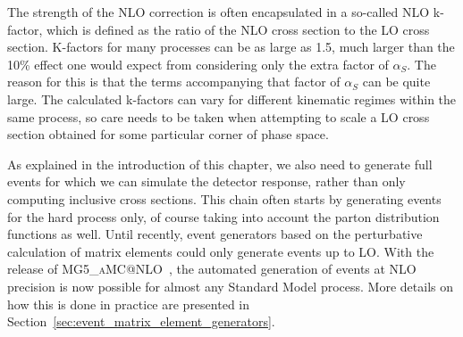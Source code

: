 The strength of the NLO correction is often encapsulated in a so-called NLO k-factor, which is
defined as the ratio of the NLO cross section to the LO cross section. K-factors for many processes
can be as large as 1.5, much larger than the 10\% effect one would expect from considering only the
extra factor of $\alpha_S$. The reason for this is that the terms accompanying that factor of
$\alpha_S$ can be quite large. 
The calculated k-factors can vary for different kinematic regimes within the same process, so care
needs to be taken when attempting to scale a LO cross section obtained for some particular corner of
phase space. 


As explained in the introduction of this chapter, we also need to generate full events for
which we can simulate the detector response, rather than only computing inclusive cross sections.
This chain often starts by generating events for the hard process only, of course taking into
account the parton distribution functions as well. 
Until recently, event generators based on the perturbative calculation of matrix elements could only
generate events up to LO. 
With the release of \textsc{MG5\_aMC@NLO}~\cite{Alwall:2014hca}, the automated generation of events
at NLO precision is now possible for almost any Standard Model process.
More details on how this is done in practice are presented in
Section~\ref{sec:event_matrix_element_generators}.



